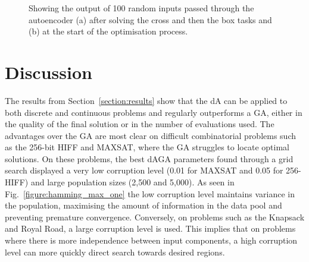 \documentclass[runningheads,a4paper]{llncs}
\begin{document}
\begin{figure}[!]
{{    \label{fig:subfig2}
    }
}
\caption[Optional caption for list of figures]{Showing the output of 100 random inputs passed through the autoencoder (a) after solving the cross and then the box tasks and (b) at the start of the optimisation process.}
\label{figure:experiment_subplots}
\end{figure}

\section{Discussion}
\vspace{-10px}The results from Section~\ref{section:results} show that the dA can be applied to both discrete and continuous problems and regularly outperforms a GA, either in the quality of the final solution or in the number of evaluations used. The advantages over the GA are most clear on difficult combinatorial problems such as the 256-bit HIFF and MAXSAT, where the GA struggles to locate optimal solutions. On these problems, the best dAGA parameters found through a grid search displayed a very low corruption level (0.01 for MAXSAT and 0.05 for 256-HIFF) and large population sizes (2,500 and 5,000). As seen in Fig.~\ref{figure:hamming_max_one} the low corruption level maintains variance in the population, maximising the amount of information in the data pool and preventing premature convergence. Conversely, on problems such as the Knapsack and Royal Road, a large corruption level is used. This implies that on problems where there is more independence between input components, a high corruption level can more quickly direct search towards desired regions.
\end{document}
